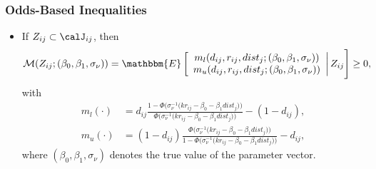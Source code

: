 \begin{frame}[label=odds]
\frametitle{Odds-Based Inequalities}

\begin{itemize}
	\item If $Z_{ij}\subset\calJ_{ij}$, then
	\begin{align*}
	\mathcal{M}(Z_{ij};(\beta_{0},\beta_{1},\sigma_{\nu}))=\mathbbm{E}
	\left[
	\begin{array}{c}
	m_{l}(d_{ij},r_{ij},dist_{j};(\beta_{0},\beta_{1},\sigma_{\nu}))\\
	m_{u}(d_{ij},r_{ij},dist_{j};(\beta_{0},\beta_{1},\sigma_{\nu}))\\
	\end{array}\right|
	Z_{ij}
	\Bigg]\geq0,
	\end{align*}
	with
	\begin{align*}
	m_{l}(\cdot)&=d_{ij}\frac{1-\Phi\big(\sigma_{\nu}^{-1}\big(kr_{ij}-\beta_{0}-\beta_{1}dist_{j}\big)\big)}{\Phi\big(\sigma_{\nu}^{-1}\big(kr_{ij}-\beta_{0}-\beta_{1}dist_{j}\big)\big)}-(1-d_{ij}),\\
	m_{u}(\cdot)&=(1-d_{ij})\frac{\Phi\big(\sigma_{\nu}^{-1}\big(kr_{ij}-\beta_{0}-\beta_{1}dist_{j}\big)\big)}{1-\Phi\big(\sigma_{\nu}^{-1}\big(kr_{ij}-\beta_{0}-\beta_{1}dist_{j}\big)\big)}-d_{ij},
	\end{align*}
	where $(\beta_{0},\beta_{1},\sigma_{\nu})$ denotes the true value of the parameter vector.
\end{itemize}
\end{frame}
